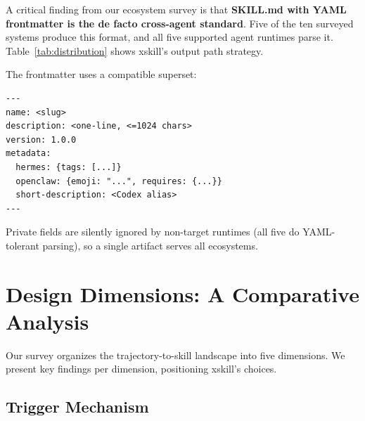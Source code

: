 \documentclass[11pt]{article}
\begin{document}
A critical finding from our ecosystem survey is that \textbf{SKILL.md with YAML frontmatter is the de facto cross-agent standard}. Five of the ten surveyed systems produce this format, and all five supported agent runtimes parse it. Table~\ref{tab:distribution} shows xskill's output path strategy.

The frontmatter uses a compatible superset:
\begin{verbatim}
---
name: <slug>
description: <one-line, <=1024 chars>
version: 1.0.0
metadata:
  hermes: {tags: [...]}
  openclaw: {emoji: "...", requires: {...}}
  short-description: <Codex alias>
---
\end{verbatim}
Private fields are silently ignored by non-target runtimes (all five do YAML-tolerant parsing), so a single artifact serves all ecosystems.


\section{Design Dimensions: A Comparative Analysis}
\label{sec:dimensions}

Our survey organizes the trajectory-to-skill landscape into five dimensions. We present key findings per dimension, positioning xskill's choices.

\subsection{Trigger Mechanism}
\end{document}
